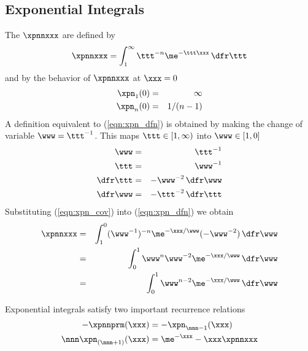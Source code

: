 \documentclass[12pt]{article}
\begin{document}
\subsection{Exponential Integrals}\label{sxn:xpn}
The  $\xpnnxxx$ are defined by
\begin{equation}
\xpnnxxx = \int_{1}^{\infty} \ttt^{-n} \me^{-\ttt \xxx} \,\dfr\ttt
\label{eqn:xpn_dfn}
\end{equation}
and by the behavior of $\xpnnxxx$ at $\xxx = 0$
\begin{eqnarray}
\xpn_{1}(0) & = & \infty \nonumber \\
\xpn_n(0) & = & 1/(n-1) \nonumber
\end{eqnarray}
A definition equivalent to (\ref{eqn:xpn_dfn}) is obtained by making
the change of variable $\www = \ttt^{-1}$.
This maps $\ttt \in [1,\infty)$ into $\www \in [1,0]$ 
\begin{eqnarray}
\www & = & \ttt^{-1} \nonumber \\
\ttt & = & \www^{-1} \nonumber \\
\dfr\ttt & = & -\www^{-2} \,\dfr\www \nonumber \\
\dfr\www & = & -\ttt^{-2} \,\dfr\ttt 
\label{eqn:xpn_cov}
\end{eqnarray}
Substituting (\ref{eqn:xpn_cov}) into (\ref{eqn:xpn_dfn}) we obtain
\begin{eqnarray}
\xpnnxxx & = & \int_{1}^{0} (\www^{-1})^{-n} \me^{-\xxx/\www} (-\www^{-2}) \,\dfr\www \nonumber \\
& = & \int_{0}^{1} \www^n \www^{-2} \me^{-\xxx/\www} \,\dfr\www \nonumber \\
& = & \int_{0}^{1} \www^{n-2} \me^{-\xxx/\www} \,\dfr\www
\label{eqn:xpn_dfn_2}
\end{eqnarray}

Exponential integrals satisfy two important recurrence relations
\begin{subequations}
\label{eqn:xpn_rcr}
\begin{align}
\label{eqn:xpn_rcr_1}
-\xpnnprm(\xxx) & = -\xpn_{\nnn-1}(\xxx) \\
\label{eqn:xpn_rcr_2}
\nnn\xpn_{(\nnn+1)}(\xxx) & = \me^{-\xxx} - \xxx \xpnnxxx
\end{align}
\end{subequations}
\end{document}
